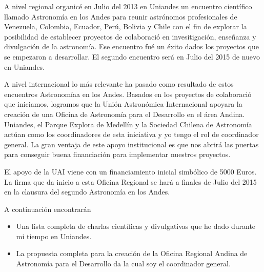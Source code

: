 \documentclass[letterpaper,12pt,onecolumn]{article}
\begin{document}
A nivel regional organic\'e  en Julio del 2013 en Uniandes un encuentro
cient\'ifico llamado Astronom\'ia en los Andes para reunir astr\'onomos
profesionales de Venezuela, Colombia, Ecuador, Per\'u, Bolivia y Chile
con el fin de explorar la posibilidad de establecer proyectos de
colaboraci\'o  en invesitigaci\'on, ense\~nanza y divulgaci\'on de la
astronom\'ia. Ese encuentro fu\'e un \'exito dados los proyectos que
se empezaron a desarrollar. El segundo encuentro ser\'a en Julio del
2015 de nuevo en Uniandes. 

A nivel internacional lo m\'as relevante ha pasado como resultado de estos
encuentros Astronom\'iaa en los Andes. Basados en los proyectos de
colaboraci\'o  que iniciamos, logramos que la Uni\'on Astron\'omica
Internacional apoyara la creaci\'on de una Oficina de Astronom\'ia
para el Desarrollo en el \'area Andina. Uniandes, el Parque Explora de
Medell\'in y la Sociedad Chilena de Astronom\'ia act\'uan como los
coordinadores de esta iniciativa y yo tengo el rol de coordinador
general. La gran ventaja de este apoyo institucional es que nos
abrir\'a las puertas para conseguir buena financiaci\'on para
implementar nuestros proyectos. 

El apoyo de la UAI viene con un financiamiento inicial simb\'olico de
5000 Euros. La firma que da inicio a esta Oficina Regional se har\'a a
finales de Julio del 2015 en la clausura del segundo Astronom\'ia en los Andes. 

  
A continuaci\'on encontrar\'an 
\begin{itemize}
\item  Una lista completa de charlas cient\'ificas y divulgativas que
  he dado durante mi tiempo en Uniandes. 
\item La propuesta completa para la creaci\'on de la Oficina Regional
  Andina de Astronom\'ia para el Desarrollo da la cual soy el
  coordinador general.
\end{itemize}
\end{document}
